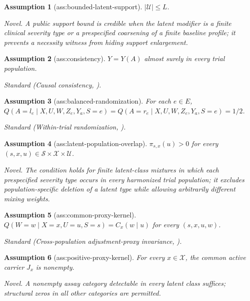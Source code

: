 \documentclass{article}
\newtheorem{assumption}{Assumption}
\begin{document}
\begin{assumption}[ass:bounded-latent-support]\label{ass:bounded-latent-support}
\(|\mathcal U|\le L\).
\par\smallskip\noindent\emph{Novel.} A public support bound is credible when the latent modifier is a finite clinical severity type or a prespecified coarsening of a finite baseline profile; it prevents a necessity witness from hiding support enlargement.
\end{assumption}

\begin{assumption}[ass:consistency]\label{ass:consistency}
\(Y=Y(A)\) almost surely in every trial population.
\par\smallskip\noindent\emph{Standard} (Causal consistency, \cite{SuRytgaardRavnEriksson2026}).
\end{assumption}

\begin{assumption}[ass:balanced-randomization]\label{ass:balanced-randomization}
For each \(e\in E\), \(Q(A=l_e\mid X,U,W,Z_e,Y_a,S=e)=Q(A=r_e\mid X,U,W,Z_e,Y_a,S=e)=1/2\).
\par\smallskip\noindent\emph{Standard} (Within-trial randomization, \cite{SuRytgaardRavnEriksson2026}).
\end{assumption}

\begin{assumption}[ass:latent-population-overlap]\label{ass:latent-population-overlap}
\(\pi_{s,x}(u)>0\) for every \((s,x,u)\in\mathcal S\times\mathcal X\times\mathcal U\).
\par\smallskip\noindent\emph{Novel.} The condition holds for finite latent-class mixtures in which each prespecified severity type occurs in every harmonized trial population; it excludes population-specific deletion of a latent type while allowing arbitrarily different mixing weights.
\end{assumption}

\begin{assumption}[ass:common-proxy-kernel]\label{ass:common-proxy-kernel}
\(Q(W=w\mid X=x,U=u,S=s)=C_x(w\mid u)\) for every \((s,x,u,w)\).
\par\smallskip\noindent\emph{Standard} (Cross-population adjustment-proxy invariance, \cite{SuRytgaardRavnEriksson2026}).
\end{assumption}

\begin{assumption}[ass:positive-proxy-kernel]\label{ass:positive-proxy-kernel}
For every \(x\in\mathcal X\), the common active carrier \(J_x\) is nonempty.
\par\smallskip\noindent\emph{Novel.} A nonempty assay category detectable in every latent class suffices; structural zeros in all other categories are permitted.
\end{assumption}
\end{document}
